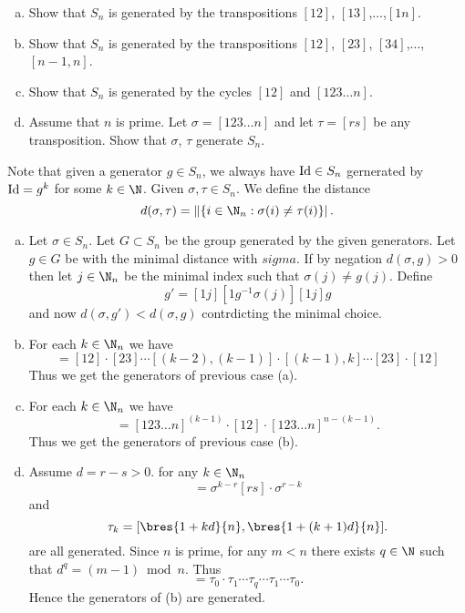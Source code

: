 \documentclass[12pt]{book}
\def\Id{\mathop{\rm Id}\nolimits}
\newcounter{myenumi}
\newenvironment{myenumerate}
{\begin{enumerate}
 \setcounter{enumi}{\themyenumi}
}
{\setcounter{myenumi}{\theenumi}
 \end{enumerate}}
\begin{document}
\begin{myenumerate}
\begin{excopy}
\begin{enumerate}[(a)]
\item
Show that \(S_n\) is generated by the transpositions
\([12]\), \([13]\),\(\ldots\),\([1n]\).
\item
Show that \(S_n\) is generated by the transpositions
\([12]\), \([23]\), \([34]\),\(\ldots\),\([n-1,n]\).
\item
Show that \(S_n\) is generated by the cycles \([12]\) and \([1 2 3 \ldots n]\).
\item
Assume that $n$ is prime.
Let \(\sigma = [1 2 3 \ldots n]\) and let \(\tau = [rs]\) be any transposition.
Show that \(\sigma\), \(\tau\) generate \(S_n\).
\end{enumerate}
\end{excopy}

Note that given a generator \(g\in S_n\),
we always have \(\Id\in S_n\) gernerated by \(\Id = g^k\) for some \(k\in\N\).
Given \(\sigma,\tau\in S_n\). We define the distance
\begin{equation*}
d(\sigma,\tau) = \left\|\{i\in\N_n: \sigma(i) \neq \tau(i)\}\right|.
\end{equation*}
\begin{enumerate}[(a)]
\item Let \(\sigma\in S_n\). Let \(G\subset S_n\) be the group generated
by the given generators. Let \(g\in G\) be with the minimal
distance with \(sigma\).
If by negation \(d(\sigma,g) > 0\) then let \(j\in\N_n\)
be the minimal index such that \(\sigma(j)\neq g(j)\).
Define
\begin{equation*}
g' = [1 j][1 g^{-1}\sigma(j)][1 j]g
\end{equation*}
and now \(d(\sigma, g') < d(\sigma, g)\) contrdicting the minimal choice.
\item
For each \(k \in \N_n\) we have
\begin{equation*}
[1 k] = [1 2]\cdot[2 3]\cdots[(k-2),(k-1)]\cdot[(k-1),k]\cdots[2 3]\cdot[1 2]
\end{equation*}
Thus we get the generators of previous case (a).
\item
For each \(k \in \N_n\) we have
\begin{equation*}
[k,(k+1)] = [1 2 3\ldots n]^{(k-1)}\cdot[12]\cdot [1 2 3\ldots n]^{n - (k-1)}.
\end{equation*}
Thus we get the generators of previous case (b).
\item
Assume \(d=r-s>0\). for any \(k\in \N_n\)
\begin{equation*}
[k,\bres{(k+d)}{n}] = \sigma^{k-r}[r s]\cdot\sigma^{r-k}
\end{equation*}
and
\begin{equation*}
\tau_k = [\bres{1 + kd}{n}, \bres{1 + (k+1)d}{n}].
\end{equation*}
are all generated.
Since $n$ is prime, for any \(m < n\) there exists \(q\in\N\)
such that \(d^q = (m - 1) \bmod n\). Thus
\begin{equation*}
[1 m] = \tau_0\cdot\tau_1\cdots\tau_q\cdots\tau_1\cdots\tau_0.
\end{equation*}
Hence the generators of (b) are generated.
\end{enumerate}


\end{myenumerate}
\end{document}
